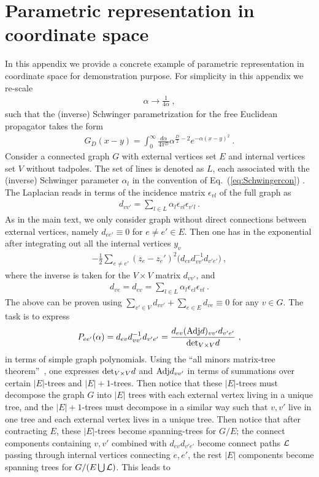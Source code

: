 \documentclass[a4paper,11pt]{article}
\begin{document}
\section{Parametric representation in coordinate space}\label{sec:para}
In this appendix we provide a concrete example of parametric representation in coordinate space for demonstration purpose. For simplicity in this appendix we re-scale
\begin{align}
\alpha \rightarrow \frac{1}{4\alpha} \ ,
\end{align}
such that the (inverse) Schwinger parametrization for the free Euclidean propagator takes the form
\begin{align}\label{eq:Schwingercon}
G_D(x-y)=\int_{0}^{\infty} \frac{d\alpha}{4 \pi^D} \alpha^{\frac{D}{2}-2}e^{-\alpha(x-y)^2} \ .
\end{align}
Consider a connected graph $G$ with external vertices set $E$ and internal vertices set $V$ without tadpoles. The set of lines is denoted as $L$, each associated with the (inverse) Schwinger parameter $\alpha_l$  in the convention of Eq.~(\ref{eq:Schwingercon}) . The Laplacian reads in terms of the incidence matrix $\epsilon_{vl}$ of the full graph as 
\begin{align}
d_{vv'}=\sum_{l \in L} \alpha_l \epsilon_{vl}\epsilon_{v'l} \ .
\end{align}
As in the main text, we only consider graph without direct connections between external vertices, namely $d_{ee'} \equiv 0$ for $e \ne e'\in E$.  Then one has in the exponential after integrating out all the internal vertices $y_v$
\begin{align}
-\frac{1}{2}\sum_{e \ne e'}(z_e-z_e')^2 \bigg(d_{ev}d^{-1}_{vv'}d_{v'e'}\bigg) \ ,
\end{align}
where the inverse is taken for the $V \times V$ matrix $d_{vv'}$, and 
\begin{align}
d_{ve}=d_{ev}=\sum_{l\in L} \alpha_l \epsilon_{el}\epsilon_{vl} \ .
\end{align}
The above can be proven using $\sum_{v'\in V}d_{vv'}+\sum_{e\in E}d_{ve} \equiv 0$ for any $v \in G$.  The task is to express 
\begin{align}
P_{ee'}(\alpha)=d_{ev}d^{-1}_{vv'}d_{v'e'}=\frac{d_{ev}({\rm Adj}d)_{vv'}d_{v'e'}}{{\rm det}_{V \times V} d} \ ,
\end{align}
in terms of simple graph polynomials. Using the ``all minors matrix-tree theorem''~\cite{Bogner:2010kv}, one expresses ${\rm det}_{V \times V} d$ and ${\rm Adj} d_{vv'}$ in terms of summations over certain $|E|$-trees and $|E|+1$-trees. Then notice that these $|E|$-trees must decompose the graph $G$ into $|E|$ trees with each external vertex living in a unique tree, and the $|E|+1$-trees must decompose in a similar way such that $v,v'$ live in one tree and each external vertex lives in a unique tree. Then notice that after contracting $E$, these $|E|$-trees become spanning-trees for $G/E$; the connect components containing $v,v'$ combined with $d_{ev}d_{v'e'}$ become connect paths ${\cal L}$ passing through internal vertices connecting $e,e'$, the rest $|E|$ components become spanning trees for $G/(E\bigcup {\cal L})$.  This leads to 
\end{document}
